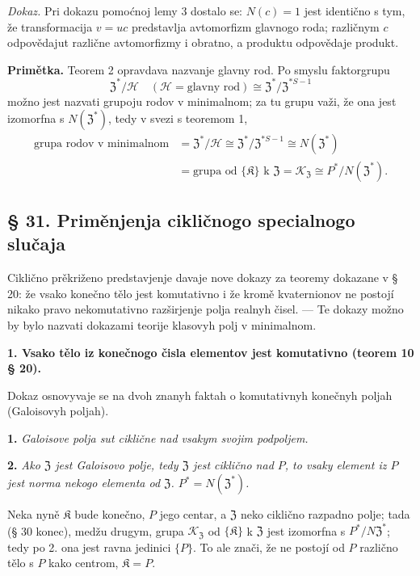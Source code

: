 \documentclass[11pt]{article}
\begin{document}
\noindent\emph{Dokaz.} Pri dokazu pomoćnoj lemy 3 dostalo se: \(N(c)=1\) jest identično s tym, že transformacija \(v=uc\) predstavlja avtomorfizm glavnogo roda; različnym \(c\) odpovědajut različne avtomorfizmy i obratno, a produktu odpovědaje produkt.

\noindent\textbf{Primětka.} Teorem 2 opravdava nazvanje glavny rod. Po smyslu faktorgrupu
\[
\mathfrak Z^*/\mathscr H
\quad(\mathscr H=\text{glavny rod})
\cong\mathfrak Z^*/\mathfrak Z^{*S-1}
\]
možno jest nazvati grupoju rodov v minimalnom; za tu grupu važi, že ona jest izomorfna s \(N(\mathfrak Z^*)\), tedy v svezi s teoremom 1,
\[
\begin{aligned}
\text{grupa rodov v minimalnom}
&=\mathfrak Z^*/\mathscr H
 \cong\mathfrak Z^*/\mathfrak Z^{*S-1}
 \cong N(\mathfrak Z^*)\\
&=\text{grupa od }\{\mathfrak K\}\text{ k }\mathfrak Z
 =\mathscr K_{\mathfrak Z}
 \cong P^*/N(\mathfrak Z^*).
\end{aligned}
\]

\subsection*{§ 31. Priměnjenja cikličnogo specialnogo slučaja}\label{anwendungen-des-zyklischen-spezialfalles}

Ciklično prěkriženo predstavjenje davaje nove dokazy za teoremy dokazane v § 20: že vsako konečno tělo jest komutativno i že kromě kvaternionov ne postojí nikako pravo nekomutativno razširjenje polja realnyh čisel. --- Te dokazy možno by bylo nazvati dokazami teorije klasovyh polj v minimalnom.

\noindent\textbf{1. Vsako tělo iz konečnogo čisla elementov jest komutativno (teorem 10 § 20).}

Dokaz osnovyvaje se na dvoh znanyh faktah o komutativnyh konečnyh poljah (Galoisovyh poljah).

\noindent\textbf{1.} \emph{Galoisove polja sut ciklične nad vsakym svojim podpoljem.}

\noindent\textbf{2.} \emph{Ako \(\mathfrak Z\) jest Galoisovo polje, tedy \(\mathfrak Z\) jest ciklično nad \(P\), to vsaky element iz \(P\) jest norma nekogo elementa od \(\mathfrak Z\). \(P^*=N(\mathfrak Z^*)\).}

Neka nyně \(\mathfrak K\) bude konečno, \(P\) jego centar, a \(\mathfrak Z\) neko ciklično razpadno polje; tada (§ 30 konec), medžu drugym, grupa \(\mathscr K_{\mathfrak Z}\) od \(\{\mathfrak K\}\) k \(\mathfrak Z\) jest izomorfna s \(P^*/N\mathfrak Z^*\); tedy po 2. ona jest ravna jedinici \(\{P\}\). To ale znači, že ne postojí od \(P\) različno tělo s \(P\) kako centrom, \(\mathfrak K=P\).
\end{document}
